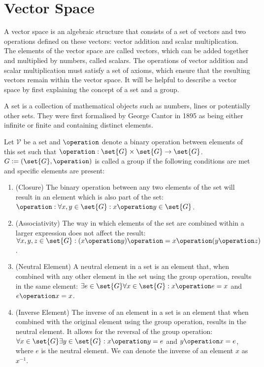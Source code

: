 \section{Vector Space}
A vector space is an algebraic structure that consists of a set of vectors and two operations defined on these vectors: vector addition and scalar multiplication. The elements of the vector space are called vectors, which can be added together and multiplied by numbers, called scalars. The operations of vector addition and scalar multiplication must satisfy a set of axioms, which ensure that the resulting vectors remain within the vector space. It will be helpful to describe a vector space by first explaining the concept of a set and a group. 

A set is a collection of mathematical objects such as numbers, lines or potentially other sets. They were first formalised by George Cantor in 
1895 \cite{cantor1895beitrage} as being either infinite or finite and containing distinct elements. 
\begin{definition}
	\normalfont
	Let $ \mathcal{V} $ be a set and $ \operation $ denote a binary operation between elements of this set such that $ \operation : \set{G} \times \set{G} \rightarrow \set{G} $. $G := (\set{G}, \operation)$ is called a group  \cite{mml_group_36} if the following conditions are met and specific elements are present:
	\begin{enumerate}
		\item (Closure) The binary operation between any two elements of the set will result in an element which is also part of the set: $ \operation : \forall x,y \in \set{G} : x \operation y \in \set{G} $.
		\item (Associativity) The way in which elements of the set are combined within a larger expression does not affect the result: $ \forall x, y, z \in \set{G} : (x \operation y) \operation = x \operation (y \operation z) $.
		\item (Neutral Element) A neutral element in a set is an element that, when combined with any other element in the set using the group operation, results in the same element: $ \exists e  \in \set{G} \forall x \in \set{G} : x \operation e = x$ and $ e \operation x = x $.
		\item (Inverse Element) The inverse of an element in a set is an element that when combined with the original element using the group operation, results in the neutral element. It allows for the reversal of the group operation: $ \forall x \in \set{G} \exists y \in \set{G} :  x \operation y = e$ and $ y \operation x = e $, where $ e $ is the neutral element. We can denote the inverse of an element $ x $ as $ x^{-1} $.
	\end{enumerate}
\end{definition}

